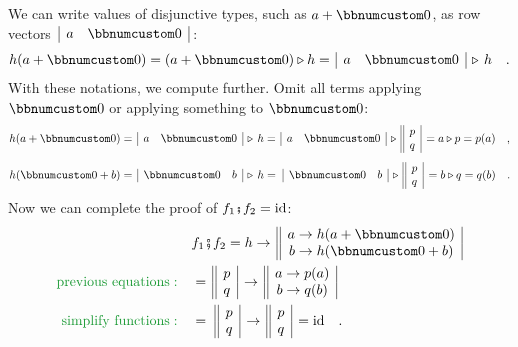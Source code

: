 We can write values of disjunctive types, such as $a+\bbnum 0$, as
row vectors $\,\begin{array}{|cc|}
a & \bbnum 0\end{array}\,$:
\begin{equation}
h(a+\bbnum 0)=(a+\bbnum 0)\triangleright h=\,\begin{array}{|cc|}
a & \bbnum 0\end{array}\,\triangleright\,h\quad.\label{eq:forward-notation-}
\end{equation}
With these notations, we compute further. Omit all terms applying
$\bbnum 0$ or applying something to $\bbnum 0$:
\[
h(a+\bbnum 0)=\,\begin{array}{|cc|}
a & \bbnum 0\end{array}\,\triangleright\,h=\,\begin{array}{|cc|}
a & \bbnum 0\end{array}\,\triangleright\,\begin{array}{||c|}
p\\
q
\end{array}\,=a\triangleright p=p(a)\quad,
\]
\[
h(\bbnum 0+b)=\,\begin{array}{|cc|}
\bbnum 0 & b\end{array}\,\triangleright\,h=\,\,\begin{array}{|cc|}
\bbnum 0 & b\end{array}\,\triangleright\,\begin{array}{||c|}
p\\
q
\end{array}\,=b\triangleright q=q(b)\quad.
\]
Now we can complete the proof of $f_{1}\bef f_{2}=\text{id}$:
\begin{align*}
 & f_{1}\bef f_{2}=h\rightarrow\,\begin{array}{||c|}
a\rightarrow h(a+\bbnum 0)\\
b\rightarrow h(\bbnum 0+b)
\end{array}\\
{\color{greenunder}\text{previous equations}:}\quad & =\,\begin{array}{||c|}
p\\
q
\end{array}\,\rightarrow\,\begin{array}{||c|}
a\rightarrow p(a)\\
b\rightarrow q(b)
\end{array}\\
{\color{greenunder}\text{simplify functions}:}\quad & =\,\,\begin{array}{||c|}
p\\
q
\end{array}\,\rightarrow\,\begin{array}{||c|}
p\\
q
\end{array}\,=\text{id}\quad.
\end{align*}

